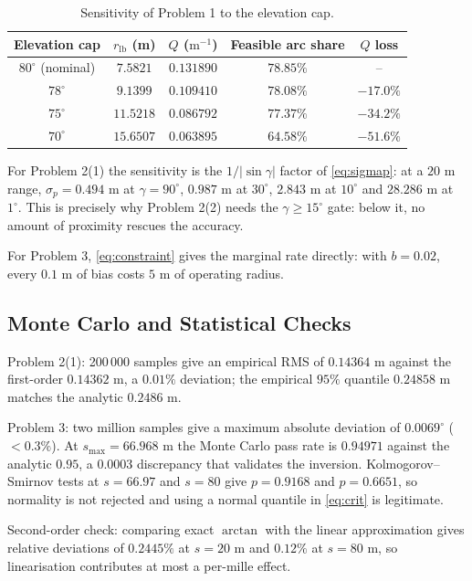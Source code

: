 \documentclass[12pt]{article}
\begin{document}
\begin{table}[htbp]
  \centering
  \caption{Sensitivity of Problem 1 to the elevation cap.}
  \label{tab:sens1}
  \begin{tabular}{ccccc}
    \toprule
    Elevation cap & $r_{\mathrm{lb}}$ (m) & $Q$ ($\mathrm{m^{-1}}$) & Feasible arc share & $Q$ loss \\
    \midrule
    $80^\circ$ (nominal) & $7.5821$ & $0.131890$ & $78.85\%$ & -- \\
    $78^\circ$ & $9.1399$ & $0.109410$ & $78.08\%$ & $-17.0\%$ \\
    $75^\circ$ & $11.5218$ & $0.086792$ & $77.37\%$ & $-34.2\%$ \\
    $70^\circ$ & $15.6507$ & $0.063895$ & $64.58\%$ & $-51.6\%$ \\
    \bottomrule
  \end{tabular}
\end{table}

For Problem 2(1) the sensitivity is the $1/|\sin\gamma|$ factor of \eqref{eq:sigmap}: at a $20$ m range, $\sigma_p=0.494$ m at $\gamma=90^\circ$, $0.987$ m at $30^\circ$, $2.843$ m at $10^\circ$ and $28.286$ m at $1^\circ$. This is precisely why Problem 2(2) needs the $\gamma\ge15^\circ$ gate: below it, no amount of proximity rescues the accuracy.

For Problem 3, \eqref{eq:constraint} gives the marginal rate directly: with $b=0.02$, every $0.1$ m of bias costs $5$ m of operating radius.

\subsection{Monte Carlo and Statistical Checks}

Problem 2(1): 200\,000 samples give an empirical RMS of $0.14364$ m against the first-order $0.14362$ m, a $0.01\%$ deviation; the empirical $95\%$ quantile $0.24858$ m matches the analytic $0.2486$ m\cite{robert2004mc}.

Problem 3: two million samples give a maximum absolute deviation of $0.0069^\circ$ ($<0.3\%$). At $s_{\max}=66.968$ m the Monte Carlo pass rate is $0.94971$ against the analytic $0.95$, a $0.0003$ discrepancy that validates the inversion. Kolmogorov--Smirnov tests at $s=66.97$ and $s=80$ give $p=0.9168$ and $p=0.6651$, so normality is not rejected and using a normal quantile in \eqref{eq:crit} is legitimate.

Second-order check: comparing exact $\arctan$ with the linear approximation gives relative deviations of $0.2445\%$ at $s=20$ m and $0.12\%$ at $s=80$ m, so linearisation contributes at most a per-mille effect.
\end{document}
